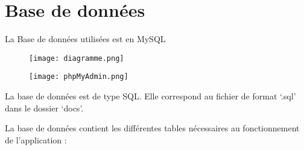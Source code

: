 \documentclass{article}
\begin{document}
\section{Base de données}
La Base de données utilisées est en MySQL

\begin{figure}[h!]
\centering
\texttt{[image: diagramme.png]}
\caption{}
\end{figure}

\begin{figure}[h!]
\centering
\texttt{[image: phpMyAdmin.png]}
\caption{}
\end{figure}

La  base  de  données  est  de  type SQL. Elle  correspond  au  fichier  de  format  ‘.sql’  dans  le dossier ‘docs’.

La  base  de  données  contient  les  différentes  tables  nécessaires  au  fonctionnement  de l’application :
\end{document}
